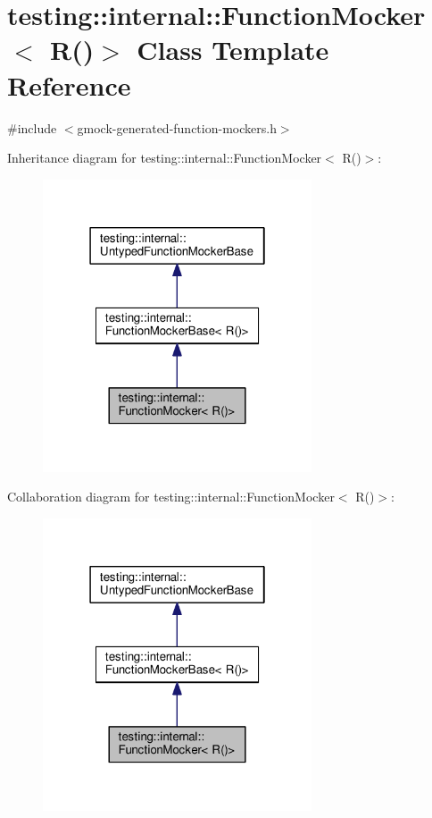 \hypertarget{classtesting_1_1internal_1_1FunctionMocker_3_01R_07_08_4}{}\section{testing\+:\+:internal\+:\+:Function\+Mocker$<$ R()$>$ Class Template Reference}
\label{classtesting_1_1internal_1_1FunctionMocker_3_01R_07_08_4}


{\ttfamily \#include $<$gmock-\/generated-\/function-\/mockers.\+h$>$}



Inheritance diagram for testing\+:\+:internal\+:\+:Function\+Mocker$<$ R()$>$\+:\nopagebreak
\begin{figure}[H]
\begin{center}
\leavevmode
\includegraphics[width=226pt]{classtesting_1_1internal_1_1FunctionMocker_3_01R_07_08_4__inherit__graph}
\end{center}
\end{figure}


Collaboration diagram for testing\+:\+:internal\+:\+:Function\+Mocker$<$ R()$>$\+:\nopagebreak
\begin{figure}[H]
\begin{center}
\leavevmode
\includegraphics[width=226pt]{classtesting_1_1internal_1_1FunctionMocker_3_01R_07_08_4__coll__graph}
\end{center}
\end{figure}
